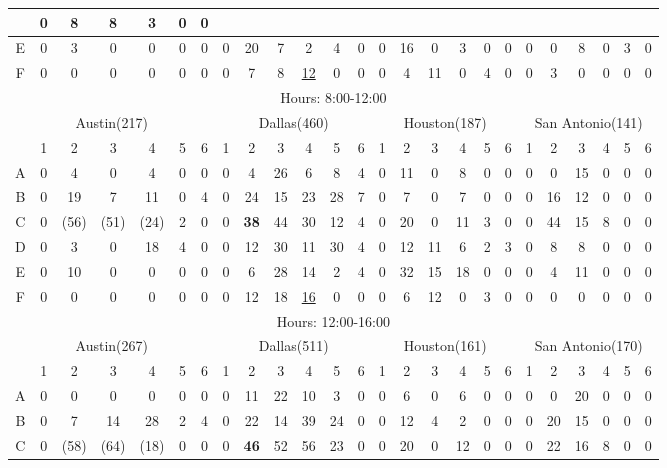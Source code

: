 \begin{table*}
\begin{tabular}{|c|c|c|c|c|c|c|c|c|c|c|c|c|c|c|c|c|c|c|c|c|c|c|c|c|}
& 0& 8& 8& 3& 0& 0\\
\hline
E
& 0& 3& 0& 0& 0& 0
& 0& 20& 7& 2& 4& 0
& 0& 16& 0& 3& 0& 0 
& 0& 0& 8& 0& 3& 0\\
\hline
F
& 0& 0& 0& 0& 0& 0 
& 0& 7& 8& \underline{12}& 0& 0
& 0& 4& 11& 0& 4& 0
& 0& 3& 0& 0& 0& 0\\
\hline	
\hline	
\multicolumn{25}{|c|}{Hours: 8:00-12:00} 	\\
\hline	
\multicolumn{7}{|c|}{Austin(217)} 	&
\multicolumn{6}{c|}{Dallas(460)} 	&
\multicolumn{6}{c|}{Houston(187)} 	&
\multicolumn{6}{c|}{San Antonio(141)} 	\\
\hline	
\hline	
 & 1 &2 & 3 & 4 & 5&6 	
 & 1 &2 & 3 & 4 & 5&6 	
 & 1 &2 & 3 & 4 & 5&6 	
 & 1 &2 & 3 & 4 & 5&6 \\	
\hline
A
& 0& 4& 0& 4& 0& 0 
& 0& 4& 26& 6& 8& 4
& 0& 11& 0& 8& 0& 0 
& 0& 0& 15& 0& 0& 0\\
\hline
B
& 0& 19& 7& 11& 0& 4
& 0& 24& 15& 23& 28& 7
& 0& 7& 0& 7& 0& 0
& 0& 16& 12& 0& 0& 0 \\
\hline
C
& 0& (56)& (51)& (24)& 2& 0
& 0&\textbf{38}& 44& 30& 12& 4 
& 0& 20& 0& 11& 3& 0
& 0& 44& 15& 8& 0& 0 \\
\hline
D
& 0& 3& 0& 18& 4& 0
& 0& 12& 30& 11& 30& 4 
& 0& 12& 11& 6& 2& 3 
& 0& 8& 8& 0& 0& 0 \\
\hline
E
& 0& 10& 0& 0& 0& 0
& 0& 6& 28& 14& 2& 4
& 0& 32& 15& 18& 0& 0
& 0& 4& 11& 0& 0& 0 \\
\hline
F
& 0& 0& 0& 0& 0& 0
& 0& 12& 18& \underline{16}& 0& 0
& 0& 6& 12& 0& 3& 0 
& 0& 0& 0& 0& 0& 0 \\
\hline
\hline	
\multicolumn{25}{|c|}{Hours: 12:00-16:00} 	\\
\hline	
\multicolumn{7}{|c|}{Austin(267)} 	&
\multicolumn{6}{c|}{Dallas(511)} 	&
\multicolumn{6}{c|}{Houston(161)} 	&
\multicolumn{6}{c|}{San Antonio(170)} 	\\
\hline	
\hline	
 & 1 &2 & 3 & 4 & 5&6 	
 & 1 &2 & 3 & 4 & 5&6 	
 & 1 &2 & 3 & 4 & 5&6 	
 & 1 &2 & 3 & 4 & 5&6 \\	
\hline
A
& 0& 0& 0& 0& 0& 0 
& 0& 11& 22& 10& 3& 0 
& 0& 6& 0& 6& 0& 0
& 0& 0& 20& 0& 0& 0\\
\hline
B
& 0& 7& 14& 28& 2& 4
& 0& 22& 14& 39& 24& 0 
& 0& 12& 4& 2& 0& 0
& 0& 20& 15& 0& 0& 0 \\
\hline
C
& 0& (58)& (64)& (18)& 0& 0
& 0& \textbf{46}& 52& 56& 23& 0 
& 0& 20& 0& 12& 0& 0 
& 0& 22& 16& 8& 0& 0 \\

\end{tabular}
\end{table*}

